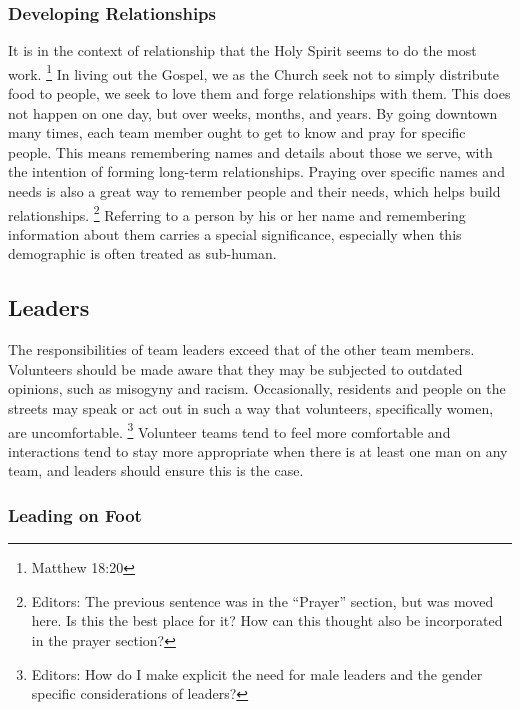 \documentclass[12pt]{article}
\begin{document}
\subsubsection{Developing Relationships}

    \qPiperCoronary
    It is in the context of relationship that the Holy Spirit seems to do the most work.
    \footnote{Matthew 18:20}
    In living out the Gospel, we as the Church seek not to simply distribute food to people, we seek to love them and forge relationships with them.
    This does not happen on one day, but over weeks, months, and years.
    By going downtown many times, each team member ought to get to know and pray for specific people.
    This means remembering names and details about those we serve, with the intention of forming long-term relationships.
    Praying over specific names and needs is also a great way to remember people and their needs, which helps build relationships.
    \footnote{Editors: The previous sentence was in the ``Prayer'' section, but was moved here. Is this the best place for it? How can this thought also be incorporated in the prayer section?}
    Referring to a person by his or her name and remembering information about them carries a special significance, especially when this demographic is often treated as sub-human.

\subsection{Leaders}

    The responsibilities of team leaders exceed that of the other team members.
    Volunteers should be made aware that they may be subjected to outdated opinions, such as misogyny and racism.
    Occasionally, residents and people on the streets may speak or act out in such a way that volunteers, specifically women, are uncomfortable.
    \footnote{Editors: How do I make explicit the need for male leaders and the gender specific considerations of leaders?}
    Volunteer teams tend to feel more comfortable and interactions tend to stay more appropriate when there is at least one man on any team, and leaders should ensure this is the case.

\subsubsection{Leading on Foot}
\end{document}
